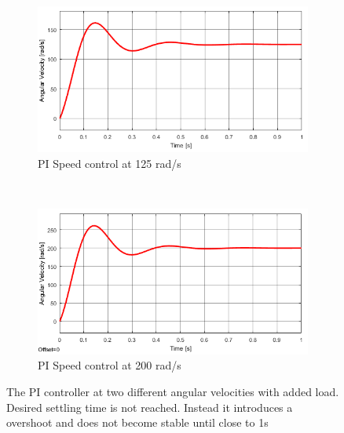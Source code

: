 \begin{figure}[h!]
	\centering
	\begin{subfigure}[b]{0.45\textwidth}
		\includegraphics[width=\textwidth]{graphics/PI_load125}
		\caption{PI Speed control at 125 rad/s}
		\label{fig:piload125}
	\end{subfigure}
	~ %
	\begin{subfigure}[b]{0.45\textwidth}
		\includegraphics[width=\textwidth]{graphics/PI_load200}
		\caption{PI Speed control at 200 rad/s}
		\label{fig:piload200}
	\end{subfigure}
	\caption{The PI controller at two different angular velocities with added load. Desired settling time is not reached. Instead it introduces a overshoot and does not become stable until close to 1s}\label{fig:piload}
\end{figure}


